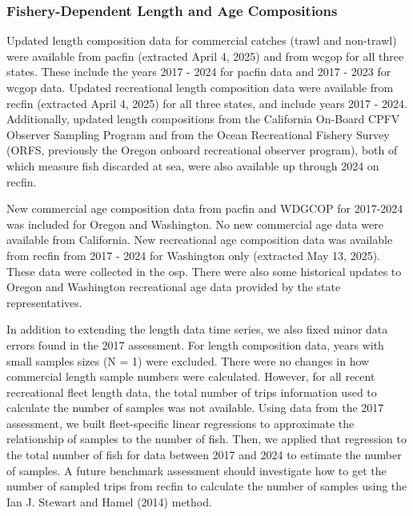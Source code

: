 \documentclass[
]{scrartcl}
\begin{document}
\subsubsection{Fishery-Dependent Length and Age
Compositions}\label{sec-fd_comps}

Updated length composition data for commercial catches (trawl and
non-trawl) were available from \gls{pacfin} (extracted April 4, 2025)
and from \gls{wcgop} for all three states. These include the years 2017
- 2024 for \gls{pacfin} data and 2017 - 2023 for \gls{wcgop} data.
Updated recreational length composition data were available from
\gls{recfin} (extracted April 4, 2025) for all three states, and include
years 2017 - 2024. Additionally, updated length compositions from the
California On-Board CPFV Observer Sampling Program and from the Ocean
Recreational Fishery Survey (ORFS, previously the Oregon onboard
recreational observer program), both of which measure fish discarded at
sea, were also available up through 2024 on \gls{recfin}.

New commercial age composition data from \gls{pacfin} and WDGCOP for
2017-2024 was included for Oregon and Washington. No new commercial age
data were available from California. New recreational age composition
data was available from \gls{recfin} from 2017 - 2024 for Washington
only (extracted May 13, 2025). These data were collected in the
\gls{osp}. There were also some historical updates to Oregon and
Washington recreational age data provided by the state representatives.

In addition to extending the length data time series, we also fixed
minor data errors found in the 2017 assessment. For length composition
data, years with small samples sizes (N = 1) were excluded. There were
no changes in how commercial length sample numbers were calculated.
However, for all recent recreational fleet length data, the total number
of trips information used to calculate the number of samples was not
available. Using data from the 2017 assessment, we built fleet-specific
linear regressions to approximate the relationship of samples to the
number of fish. Then, we applied that regression to the total number of
fish for data between 2017 and 2024 to estimate the number of samples. A
future benchmark assessment should investigate how to get the number of
sampled trips from \gls{recfin} to calculate the number of samples using
the Ian J. Stewart and Hamel (2014) method.
\end{document}
